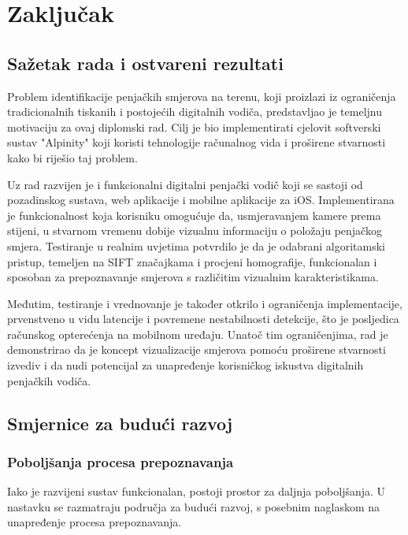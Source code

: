 \chapter{Zaključak}

\section{Sažetak rada i ostvareni rezultati}

Problem identifikacije penjačkih smjerova na terenu, koji proizlazi iz ograničenja tradicionalnih tiskanih i postojećih digitalnih vodiča, predstavljao je temeljnu motivaciju za ovaj diplomski rad. Cilj je bio implementirati cjelovit softverski sustav "Alpinity" koji koristi tehnologije računalnog vida i proširene stvarnosti kako bi riješio taj problem.

Uz rad razvijen je i funkcionalni digitalni penjački vodič koji se sastoji od pozadinskog sustava, web aplikacije i mobilne aplikacije za iOS. Implementirana je funkcionalnost koja korisniku omogućuje da, usmjeravanjem kamere prema stijeni, u stvarnom vremenu dobije vizualnu informaciju o položaju penjačkog smjera. Testiranje u realnim uvjetima potvrdilo je da je odabrani algoritamski pristup, temeljen na SIFT značajkama i procjeni homografije, funkcionalan i sposoban za prepoznavanje smjerova s različitim vizualnim karakteristikama.

Međutim, testiranje i vrednovanje je također otkrilo i ograničenja implementacije, prvenstveno u vidu latencije i povremene nestabilnosti detekcije, što je posljedica računskog opterećenja na mobilnom uređaju. Unatoč tim ograničenjima, rad je demonstrirao da je koncept vizualizacije smjerova pomoću proširene stvarnosti izvediv i da nudi potencijal za unapređenje korisničkog iskustva digitalnih penjačkih vodiča.

\section{Smjernice za budući razvoj}

\subsection{Poboljšanja procesa prepoznavanja}

Iako je razvijeni sustav funkcionalan, postoji prostor za daljnja poboljšanja. U nastavku se razmatraju područja za budući razvoj, s posebnim naglaskom na unapređenje procesa prepoznavanja.


